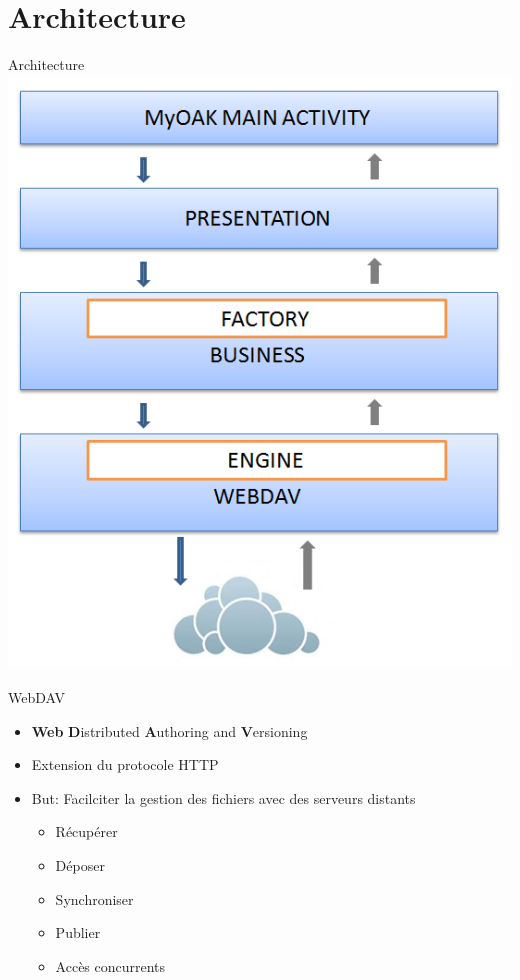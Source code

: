 \section{Architecture}
\begin{frame}{Architecture}
	\hspace{2.5cm} \includegraphics[scale=0.42]{img/Archi}
\end{frame}

\begin{frame}{WebDAV}
	\begin{itemize}
	\item \textbf{Web} \textbf{D}istributed \textbf{A}uthoring and \textbf{V}ersioning
	\item Extension du protocole HTTP
	\item But: Facilciter la gestion des fichiers avec des serveurs distants
		\begin{itemize}
		\item Récupérer
		\item Déposer
		\item Synchroniser
		\item Publier
		\item Accès concurrents
		\end{itemize}
	\end{itemize}
\end{frame}

